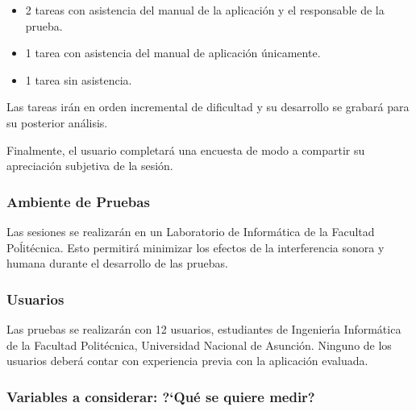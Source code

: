 \begin{itemize}
    \item 2 tareas con asistencia del manual de la aplicaci\'on y el responsable de la prueba.
    \item 1 tarea con asistencia del manual de aplicaci\'on \'unicamente.
    \item 1 tarea sin asistencia.
\end{itemize}

Las tareas ir\'an en orden incremental de dificultad y su desarrollo se grabar\'a para su posterior 
an\'alisis.

Finalmente, el usuario completará una encuesta de modo a compartir su apreciación subjetiva de la sesión.

\subsubsection{Ambiente de Pruebas}
Las sesiones se realizarán en un Laboratorio de Inform\'atica de la Facultad Poĺit\'ecnica. Esto
permitirá minimizar los efectos de la interferencia sonora y humana durante el
desarrollo de las pruebas.

\subsubsection{Usuarios}
Las pruebas se realizarán con 12 usuarios, estudiantes de Ingenier{\'\i}a Inform\'atica
de la Facultad Polit\'ecnica, Universidad Nacional de Asunci\'on. Ninguno de los usuarios 
deberá contar con experiencia previa con la aplicación evaluada.

\subsubsection{Variables a considerar: {?`}Qu\'e se quiere medir?}


